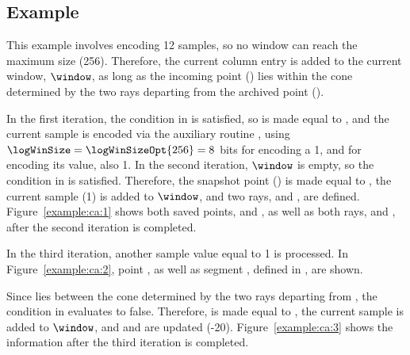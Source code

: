 




\subsection{Example}
\label{algo:ca:example}


\exampleIntro{\ref{example:ca:1}}


This example involves encoding 12 samples, so no window can reach the maximum size (256). Therefore, the current column entry is added to the current window, $\window$, as long as the incoming point (\incoming) lies within the cone determined by the two rays departing from the archived point (\archived).


In the first iteration, the condition in  is satisfied, so \archived is made equal to , and the current sample is encoded via the auxiliary routine \CAWinStart, using $\logWinSize = \logWinSizeOpt{256}=8$ bits for encoding a 1, and \tobitexp for encoding its value, also 1. In the second iteration, $\window$ is empty, so the condition in  is satisfied. Therefore, the snapshot point (\snapshot) is made equal to , the current sample (1) is added to $\window$, and two rays, \smin and \smax, are defined. Figure~\ref{example:ca:1} shows both saved points, \archived and \snapshot, as well as both rays, \smin and \smax, after the second iteration is completed.




In the third iteration, another sample value equal to 1 is processed. In Figure~\ref{example:ca:2}, point , as well as segment , defined in , are shown.




\clearpage


Since  lies between the cone determined by the two rays departing from \archived, the condition in  evaluates to false. Therefore, \snapshot is made equal to , the current sample is added to $\window$, and \smin and \smax are updated (-20). Figure~\ref{example:ca:3} shows the information after the third iteration is completed.


